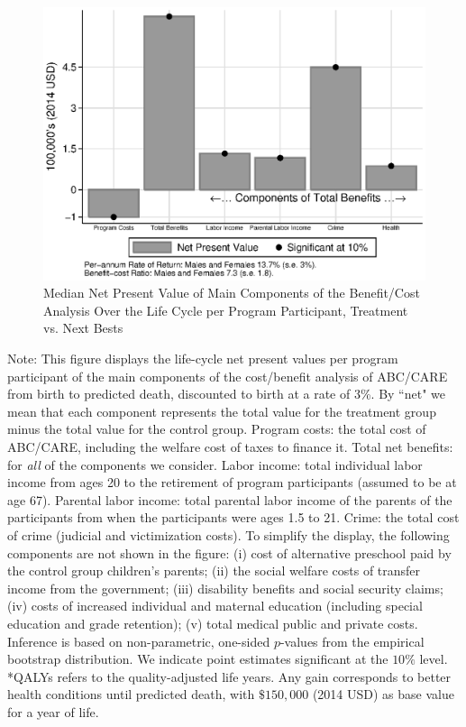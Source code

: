 \documentclass[static]{JJH-Beamer}
\begin{document}
\begin{frame}

\begin{figure}[H]
\caption{Median Net Present Value of Main Components of the Benefit/Cost Analysis Over the Life Cycle per Program Participant, Treatment vs. Next Bests}\label{figure:main}
\begin{center}
\includegraphics[width=.75\columnwidth]{output/abccare_npvssummredux.eps}
\end{center}
\end{figure}

\end{frame}

\vspace{-16mm}
{\flushleft \small Note: This figure displays the life-cycle net present values per program participant of the main components of the cost/benefit analysis of ABC/CARE from birth to predicted death, discounted to birth at a rate of 3\%. By ``net" we mean that each component represents the total value for the treatment group minus the total value for the control group. Program costs: the total cost of ABC/CARE, including the welfare cost of taxes to finance it. Total net benefits: for \textit{all} of the components we consider. Labor income: total individual labor income from ages 20 to the retirement of program participants (assumed to be at age 67). Parental labor income: total parental labor income of the parents of the participants from when the participants were ages 1.5 to 21. Crime: the total cost of crime (judicial and victimization costs). To simplify the display, the following components are not shown in the figure: (i) cost of alternative preschool paid by the control group children's parents; (ii) the social welfare costs of transfer income from the government; (iii) disability benefits and social security claims; (iv) costs of increased individual and maternal education (including special education and grade retention); (v) total medical public and private costs. Inference is based on non-parametric, one-sided $p$-values from the empirical bootstrap distribution. We indicate point estimates significant at the $10\%$ level.\\
*QALYs refers to the quality-adjusted life years. Any gain corresponds to better health conditions until predicted death, with $\$150,000$ (2014 USD) as base value for a year of life.\\}
\end{document}
